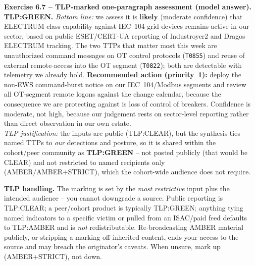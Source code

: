 \documentclass[11pt,a4paper]{article}
\begin{document}
\begin{solutionbox}
\textbf{Exercise 6.7 -- TLP-marked one-paragraph assessment (model answer).}\\
\textbf{TLP:GREEN.} \emph{Bottom line:} we assess it is \textbf{likely} (moderate confidence)
that ELECTRUM-class capability against IEC~104 grid devices remains active in our sector,
based on public ESET/CERT-UA reporting of Industroyer2 and Dragos ELECTRUM tracking. The two
TTPs that matter most this week are unauthorized command messages on OT control protocols
(\texttt{T0855}) and reuse of external remote-access into the OT segment (\texttt{T0822}); both
are detectable with telemetry we already hold. \textbf{Recommended action (priority~1):} deploy
the non-EWS command-burst notice on our IEC~104/Modbus segments and review all OT-segment
remote logons against the change calendar, because the consequence we are protecting against is
loss of control of breakers. Confidence is moderate, not high, because our judgement rests on
sector-level reporting rather than direct observation in our own estate.\\[3pt]
\emph{TLP justification:} the inputs are public (TLP:CLEAR), but the synthesis ties named TTPs
to \emph{our} detections and posture, so it is shared within the cohort/peer community as
\textbf{TLP:GREEN} -- not posted publicly (that would be CLEAR) and not restricted to named
recipients only (AMBER/AMBER+STRICT), which the cohort-wide audience does not require.
\end{solutionbox}

\begin{warnbox}
\textbf{TLP handling.} The marking is set by the \emph{most restrictive} input plus the
intended audience -- you cannot downgrade a source. Public reporting is TLP:CLEAR; a
peer/cohort product is typically TLP:GREEN; anything tying named indicators to a specific
victim or pulled from an ISAC/paid feed defaults to TLP:AMBER and is \emph{not} redistributable.
Re-broadcasting AMBER material publicly, or stripping a marking off inherited content, ends your
access to the source and may breach the originator's caveats. When unsure, mark up
(AMBER+STRICT), not down.
\end{warnbox}
\end{document}
